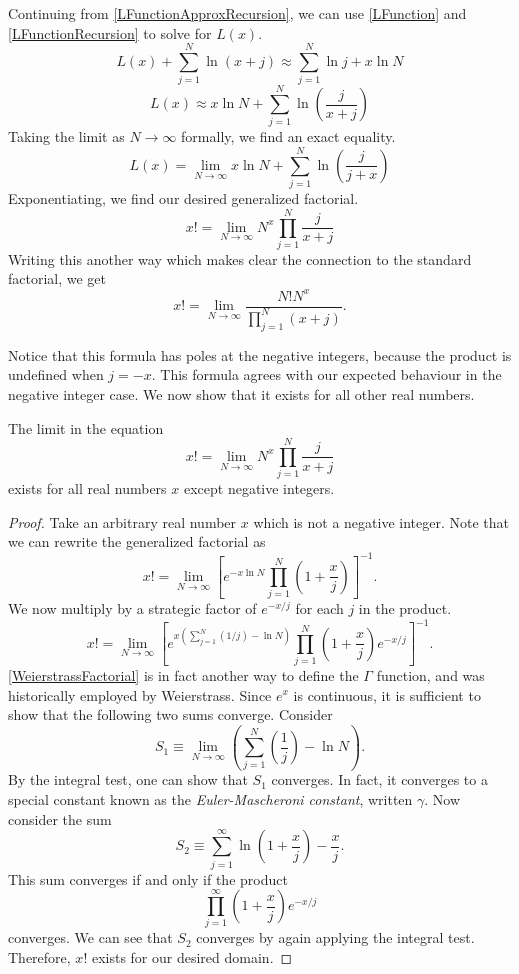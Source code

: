 Continuing from \eqref{LFunctionApproxRecursion}, we can use \eqref{LFunction} and \eqref{LFunctionRecursion} to solve for $L(x)$.
$$L(x) + \sum_{j = 1}^N \ln (x+j) \approx \sum_{j=1}^N \ln j + x \ln N$$
$$L(x) \approx x\ln N + \sum_{j=1}^N \ln \left( \frac{j}{x+j} \right)$$
Taking the limit as $N \rightarrow \infty$ formally, we find an exact equality.
$$L(x) = \lim_{N \rightarrow \infty} x \ln N + \sum_{j=1}^N \ln \left( \frac{j}{j+x} \right)$$
Exponentiating, we find our desired generalized factorial.
$$\boxed{x! = \lim_{N \rightarrow \infty} N^x \prod_{j=1}^N \frac{j}{x+j}}$$
Writing this another way which makes clear the connection to the standard factorial, we get
$$x! = \lim_{N \rightarrow \infty} \frac{N! N^x}{\prod_{j=1}^N (x+j)}.$$

Notice that this formula has poles at the negative integers, because the product is undefined when $j = -x$.
This formula agrees with our expected behaviour in the negative integer case.
We now show that it exists for all other real numbers.

\begin{prop}
The limit in the equation 
$$x! = \lim_{N \rightarrow \infty} N^x \prod_{j=1}^N \frac{j}{x+j}$$
exists for all real numbers $x$ except negative integers.
\end{prop}

\begin{proof}
Take an arbitrary real number $x$ which is not a negative integer.
Note that we can rewrite the generalized factorial as 
$$x! = \lim_{N \rightarrow \infty} \left[e^{-x \ln N} \prod_{j=1}^N \left(1 + \frac{x}{j}\right) \right]^{-1}.$$
We now multiply by a strategic factor of $e^{-x/j}$ for each $j$ in the product.
\begin{equation}\label{WeierstrassFactorial}
    x! = \lim_{N \rightarrow \infty} \left[ e^{x(\sum_{j=1}^N (1/j) - \ln N)} \prod_{j=1}^N \left(1 + \frac{x}{j}\right) e^{-x/j} \right]^{-1}.
\end{equation}
\eqref{WeierstrassFactorial} is in fact another way to define the $\Gamma$ function, and was historically employed by Weierstrass. 
Since $e^x$ is continuous, it is sufficient to show that the following two sums converge.
Consider
$$S_1 \equiv \lim_{N \rightarrow \infty} \left( \sum_{j=1}^N \left(\frac{1}{j}\right) - \ln N \right).$$
By the integral test, one can show that $S_1$ converges.
In fact, it converges to a special constant known as the \textit{Euler-Mascheroni constant}, written $\gamma$.
Now consider the sum
$$S_2 \equiv \sum_{j=1}^\infty \ln \left( 1 + \frac{x}{j} \right) - \frac{x}{j}.$$
This sum converges if and only if the product
$$\prod_{j=1}^\infty \left(1 + \frac{x}{j}\right) e^{-x/j}$$
converges.
We can see that $S_2$ converges by again applying the integral test.
Therefore, $x!$ exists for our desired domain.
\end{proof}

